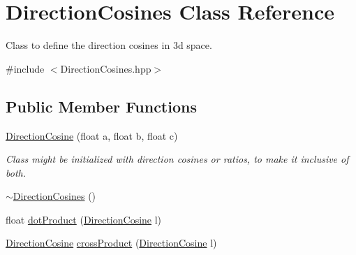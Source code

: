 \hypertarget{class_direction_cosines}{}\section{Direction\+Cosines Class Reference}
\label{class_direction_cosines}


Class to define the direction cosines in 3d space.  




{\ttfamily \#include $<$Direction\+Cosines.\+hpp$>$}

\subsection*{Public Member Functions}
\begin{DoxyCompactItemize}
\item 
\mbox{\hyperlink{class_direction_cosines_a0b0eae6aaa802ed4eed8a163a7da960a}{Direction\+Cosine}} (float a, float b, float c)
\begin{DoxyCompactList}\small\item\em Class might be initialized with direction cosines or ratios, to make it inclusive of both. \end{DoxyCompactList}\item 
\mbox{\hyperlink{class_direction_cosines_a595e87c5e381f0d877eee26ba75283c7}{$\sim$\+Direction\+Cosines}} ()
\item 
float \mbox{\hyperlink{class_direction_cosines_a734a1153319e8e5b16d794085a74fe21}{dot\+Product}} (\mbox{\hyperlink{class_direction_cosines_a0b0eae6aaa802ed4eed8a163a7da960a}{Direction\+Cosine}} l)
\item 
\mbox{\hyperlink{class_direction_cosines_a0b0eae6aaa802ed4eed8a163a7da960a}{Direction\+Cosine}} \mbox{\hyperlink{class_direction_cosines_afc5844a79ed93bc86c96ce5c303d816a}{cross\+Product}} (\mbox{\hyperlink{class_direction_cosines_a0b0eae6aaa802ed4eed8a163a7da960a}{Direction\+Cosine}} l)
\end{DoxyCompactItemize}
